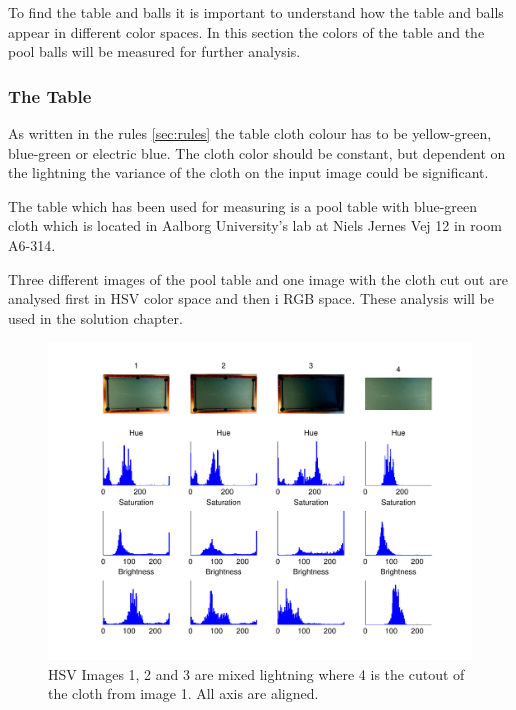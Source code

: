 To find the table and balls it is important to understand how the table and balls appear in different color spaces. In this section the colors of the table and the pool balls will be measured for further analysis.\\

\subsubsection{The Table}
As written in the rules \ref{sec:rules} the table cloth colour has to be yellow-green, blue-green or electric blue. The cloth color should be constant, but dependent on the lightning the variance of the cloth on the input image could be significant.

The table which has been used for measuring is a pool table with blue-green cloth which is located in Aalborg University's lab at Niels Jernes Vej 12 in room A6-314.

Three different images of the pool table and one image with the cloth cut out are analysed first in HSV color space and then i RGB space. These analysis will be used in the solution chapter.

\begin{figure}[H]
\begin{center}
\leavevmode
\includegraphics[width=1\textwidth]{images/hsv_hist_table}
\end{center}
\caption{HSV Images 1, 2 and 3 are mixed lightning where 4 is the cutout of the cloth from image 1. All axis are aligned.}
\label{fig:tablehsv}
\end{figure}


